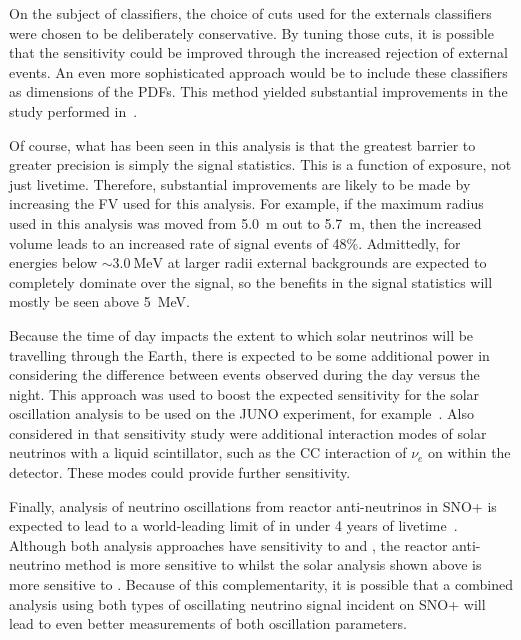 On the subject of classifiers, the choice of cuts used for the externals classifiers were chosen to be deliberately conservative. By tuning those cuts, it is possible that the sensitivity could be improved through the increased rejection of external events. An even more sophisticated approach would be to include these classifiers as dimensions of the PDFs. This method yielded substantial improvements in the \onbb{} study performed in~\cite{kroupovaImprovingSensitivityNeutrinoless2020}.

Of course, what has been seen in this analysis is that the greatest barrier to greater precision is simply the signal statistics. This is a function of exposure, not just livetime. Therefore, substantial improvements are likely to be made by increasing the FV used for this analysis. For example, if the maximum radius used in this analysis was moved from \SI{5.0}{\metre} out to \SI{5.7}{\metre}, then the increased volume leads to an increased rate of signal events of 48\%. Admittedly, for energies below $\sim\SI{3.0}{\MeV}$ at larger radii external backgrounds are expected to completely dominate over the signal, so the benefits in the signal statistics will mostly be seen above \SI{5}{\MeV}.

Because the time of day impacts the extent to which solar neutrinos will be travelling through the Earth, there is expected to be some additional power in considering the difference between events observed during the day versus the night. This approach was used to boost the expected sensitivity for the solar oscillation analysis to be used on the JUNO experiment, for example~\cite{abuslemeFeasibilityPhysicsPotential2020,zhaoModelIndependentApproach2022}. %
Also considered in that sensitivity study were additional interaction modes of solar neutrinos with a liquid scintillator, such as the CC interaction of $\nu_{e}$ on  within the detector. These modes could provide further sensitivity.

Finally, analysis of neutrino oscillations from reactor anti-neutrinos in SNO+ is expected to lead to a world-leading limit of \dmsq{} in under 4 years of livetime~\cite{morton-blakeFirstMeasurementReactor2021}. Although both analysis approaches have sensitivity to \dmsq{} and \tonetwo{}, the reactor anti-neutrino method is more sensitive to \dmsq{} whilst the solar analysis shown above is more sensitive to \tonetwo{}. Because of this complementarity, it is possible that a combined analysis using both types of oscillating neutrino signal incident on SNO+ will lead to even better measurements of both oscillation parameters.


